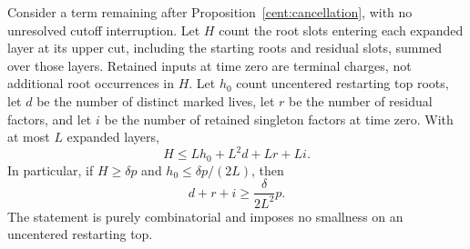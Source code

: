 \begin{proposition}\label{cent:charges}
Consider a term remaining after Proposition~\ref{cent:cancellation},
with no unresolved cutoff interruption. Let $H$ count the root slots
entering each expanded layer at its upper cut, including the starting
roots and residual slots, summed over those layers.
Retained inputs at time zero are terminal charges,
not additional root occurrences in $H$. Let $h_0$ count uncentered
restarting top roots, let $d$ be the number of distinct marked lives,
let $r$ be the number of residual factors, and let $i$ be the number
of retained singleton factors at time zero. With at most $L$ expanded
layers,
\begin{equation}\label{cent:charge-bound}
 H\leq Lh_0+L^2d+Lr+Li.
\end{equation}
In particular, if $H\geq\delta p$ and $h_0\leq\delta p/(2L)$, then
\begin{equation}\label{cent:extensive-charges}
 d+r+i\geq\frac{\delta}{2L^2}p.
\end{equation}
The statement is purely combinatorial and imposes no smallness on an
uncentered restarting top.
\end{proposition}
